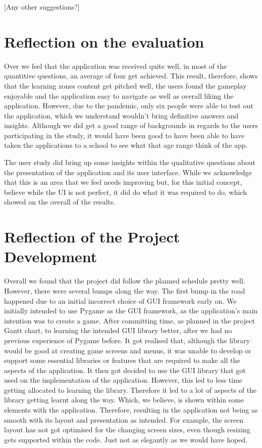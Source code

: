 		[Any other suggestions?]

	\section{Reflection on the evaluation}
		Over we feel that the application was received quite well, in most of the quantitive questions, an average of four get achieved. This result, therefore, shows that the learning zones content get pitched well, the users found the gameplay enjoyable and the application easy to navigate as well as overall liking the application. However, due to the pandemic, only six people were able to test out the application, which we understand wouldn't bring definitive answers and insights. Although we did get a good range of backgrounds in regards to the users participating in the study, it would have been good to have been able to have taken the applications to a school to see what that age range think of the app.
		
		The user study did bring up some insights within the qualitative questions about the presentation of the application and its user interface. While we acknowledge that this is an area that we feel needs improving but, for this initial concept, believe while the UI is not perfect, it did do what it was required to do, which showed on the overall of the results.


	\section{Reflection of the Project Development}
		Overall we found that the project did follow the planned schedule pretty well. However, there were several bumps along the way. The first bump in the road happened due to an initial incorrect choice of GUI framework early on. We initially intended to use Pygame as the GUI framework, as the application's main intention was to create a game. After committing time, as planned in the project Gantt chart, to learning the intended GUI library better, after we had no previous experience of Pygame before. It got realised that, although the library would be good at creating game screens and menus, it was unable to develop or support some essential libraries or features that are required to make all the aspects of the application. It then got decided to use the GUI library that got used on the implementation of the application. However, this led to less time getting allocated to learning the library. Therefore it led to a lot of aspects of the library getting learnt along the way. Which, we believe, is shown within some elements with the application. Therefore, resulting in the application not being as smooth with its layout and presentation as intended. For example, the screen layout has not got optimised for the changing screen sizes, even though resizing gets supported within the code. Just not as elegantly as we would have hoped.

